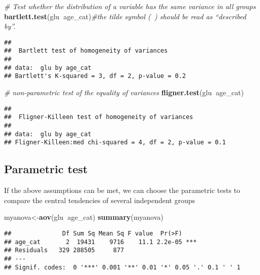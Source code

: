 \documentclass[]{book}
\newenvironment{Shaded}{\begin{snugshade}}{\end{snugshade}}
\newcommand{\KeywordTok}[1]{\textcolor[rgb]{0.13,0.29,0.53}{\textbf{#1}}}
\newcommand{\CommentTok}[1]{\textcolor[rgb]{0.56,0.35,0.01}{\textit{#1}}}
\newcommand{\OperatorTok}[1]{\textcolor[rgb]{0.81,0.36,0.00}{\textbf{#1}}}
\newcommand{\NormalTok}[1]{#1}
\theoremstyle{definition}
\theoremstyle{definition}
\theoremstyle{definition}
\theoremstyle{remark}
\begin{document}
\begin{Shaded}
\begin{Highlighting}[]
\CommentTok{# Test whether the distribution of a variable has the same variance in all groups }
\KeywordTok{bartlett.test}\NormalTok{(glu}\OperatorTok{~}\NormalTok{age_cat)}\CommentTok{#the tilde symbol (~) should be read as “described by”.}
\end{Highlighting}
\end{Shaded}

\begin{verbatim}
## 
##  Bartlett test of homogeneity of variances
## 
## data:  glu by age_cat
## Bartlett's K-squared = 3, df = 2, p-value = 0.2
\end{verbatim}

\begin{Shaded}
\begin{Highlighting}[]
\CommentTok{# non-parametric test of the equality of variances}
\KeywordTok{fligner.test}\NormalTok{(glu}\OperatorTok{~}\NormalTok{age_cat)}
\end{Highlighting}
\end{Shaded}

\begin{verbatim}
## 
##  Fligner-Killeen test of homogeneity of variances
## 
## data:  glu by age_cat
## Fligner-Killeen:med chi-squared = 4, df = 2, p-value = 0.1
\end{verbatim}

\subsection{Parametric test}\label{parametric-test}

If the above assumptions can be met, we can choose the parametric tests
to compare the central tendencies of several independent groups

\begin{Shaded}
\begin{Highlighting}[]
\NormalTok{myanova<-}\KeywordTok{aov}\NormalTok{(glu}\OperatorTok{~}\NormalTok{age_cat) }
\KeywordTok{summary}\NormalTok{(myanova)}
\end{Highlighting}
\end{Shaded}

\begin{verbatim}
##              Df Sum Sq Mean Sq F value  Pr(>F)    
## age_cat       2  19431    9716    11.1 2.2e-05 ***
## Residuals   329 288505     877                    
## ---
## Signif. codes:  0 '***' 0.001 '**' 0.01 '*' 0.05 '.' 0.1 ' ' 1
\end{verbatim}
\end{document}
